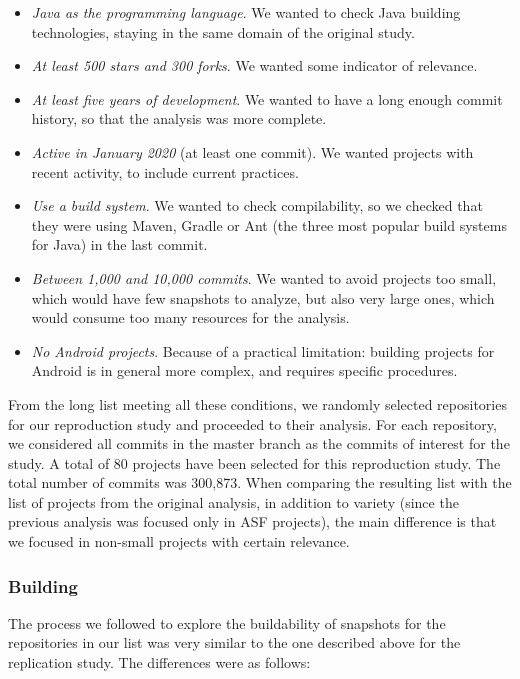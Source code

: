 \begin{itemize}
\item \textit{Java as the programming language}. We wanted to check Java building technologies, staying in the same domain of the original study.
\item \textit{At least 500 stars and 300 forks}. We wanted some indicator of relevance.
\item \textit{At least five years of development}. We wanted to have a long enough commit history, so that the analysis was more complete.
\item \textit{Active in January 2020} (at least one commit). We wanted projects with recent activity, to include current practices.
\item \textit{Use a build system}. We wanted to check compilability, so we checked that they were using Maven, Gradle or Ant (the three most popular build systems for Java) in the last commit.
\item \textit{Between 1,000 and 10,000 commits}. We wanted to avoid projects too small, which would have few snapshots to analyze, but also very large ones, which would consume too many resources for the analysis.
\item \textit{No Android projects}. Because of a practical limitation: building projects for Android is in general more complex, and requires specific procedures.
\end{itemize}

From the long list meeting all these conditions, we randomly selected repositories for our reproduction study and proceeded to their analysis.
For each repository, we considered all commits in the master branch as the commits of interest for the study. 
A total of 80 projects have been selected for this reproduction study.
The total number of commits was 300,873.
When comparing the resulting list with the list of projects from the original analysis, in addition to variety (since the previous analysis was focused only in ASF projects), the main difference is that we focused in non-small projects with certain relevance.

\subsubsection{Building}

The process we followed to explore the buildability of snapshots for the repositories in our list was very similar to the one described above for the replication study. The differences were as follows:


